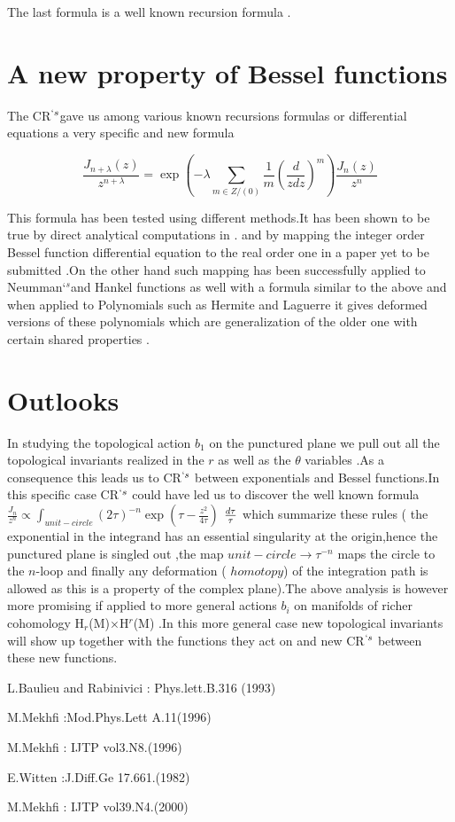 \documentclass[a4paper,11pt]{article}
\begin{document}
The last formula is a well known recursion formula .

\section{\protect\smallskip A new property of Bessel functions}

The CR$^{`s}$gave us among various known recursions formulas or differential
equations a very specific and new formula

\begin{equation}
\frac{J_{n+\lambda }(z)}{z^{n+\lambda }}=\exp (-\lambda \sum_{m\in Z/(0)}%
\frac{1}{m}(\frac{d}{zdz})^{m})\frac{J_{n}(z)}{z^{n}}  \label{t3}
\end{equation}

This formula has been tested using different methods$.$It has been shown to
be true  by direct analytical computations in . \cite{Nadia} and by mapping
the integer order Bessel function differential equation to the real order
one in a paper yet to be submitted .On the other hand such mapping has been
successfully applied to Neumman`$^{s}$and Hankel functions as well with a
formula similar to the above and when applied to Polynomials such as Hermite
and Laguerre it gives deformed versions of these polynomials which are
generalization of the older one with certain shared properties .

\section{Outlooks}

In studying the topological action $b_{1}$ on the punctured plane we pull
out all the topological invariants realized in the $r$ as well as the $%
\theta $ variables .As a consequence this leads us to CR$^{`s}$ between
exponentials and Bessel functions$.$In this specific case CR$^{`s}$ could
have led us to discover the well known formula $\frac{J_{n}}{z^{n}}\propto
\int _{unit-circle}(2\tau )^{-n}\exp (\tau -\frac{z^{2}}{4\tau })$ $\frac{%
d\tau }{\tau }$ which summarize these rules ( the exponential in the
integrand has an essential singularity at the origin,hence the punctured
plane is singled out ,the map $unit-circle$$\rightarrow \tau ^{-n}$ maps the
circle to the $n$-loop and finally any deformation ( $homotopy$) of the
integration path is allowed as this is a property of the complex plane).The
above analysis is however more promising if applied to more general actions $%
b_{i}$ on manifolds of richer cohomology H$_{r}$(M)$\times $H$^{r}$(M) .In
this more general case new topological invariants will show up together with
the functions they act on and new CR$^{`s}$ between these new functions.

\begin{thebibliography}{9}
 L.Baulieu and Rabinivici : Phys.lett.B.316 (1993)

 M.Mekhfi :Mod.Phys.Lett A.11(1996)

 M.Mekhfi : IJTP vol3.N8.(1996)

 E.Witten :J.Diff.Ge 17.661.(1982)

 M.Mekhfi : IJTP vol39.N4.(2000)
\end{thebibliography}
\end{document}
